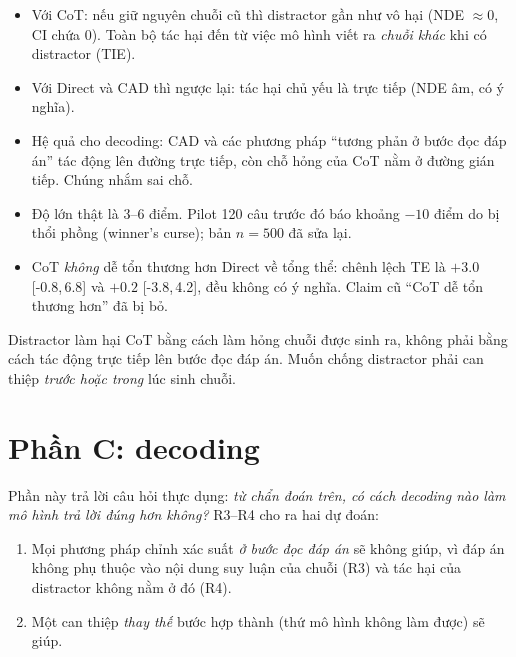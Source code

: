 \documentclass[11pt]{article}
\newcommand{\ci}[2]{{\scriptsize[#1,\,#2]}}
\begin{document}
\begin{cachdoc}
\begin{itemize}[leftmargin=*,itemsep=1pt]
\item Với CoT: nếu giữ nguyên chuỗi cũ thì distractor gần như vô hại (NDE $\approx 0$, CI chứa 0).
  Toàn bộ tác hại đến từ việc mô hình viết ra \emph{chuỗi khác} khi có distractor (TIE).
\item Với Direct và CAD thì ngược lại: tác hại chủ yếu là trực tiếp (NDE âm, có ý nghĩa).
\item Hệ quả cho decoding: CAD và các phương pháp ``tương phản ở bước đọc đáp án'' tác động lên
  đường trực tiếp, còn chỗ hỏng của CoT nằm ở đường gián tiếp. Chúng nhắm sai chỗ.
\item Độ lớn thật là 3--6 điểm. Pilot 120 câu trước đó báo khoảng $-10$ điểm do bị thổi phồng
  (winner's curse); bản $n=500$ đã sửa lại.
\item CoT \emph{không} dễ tổn thương hơn Direct về tổng thể: chênh lệch TE là $+3.0$
  \ci{-0.8}{6.8} và $+0.2$ \ci{-3.8}{4.2}, đều không có ý nghĩa. Claim cũ ``CoT dễ tổn thương
  hơn'' đã bị bỏ.
\end{itemize}
\end{cachdoc}

\begin{ketluan}
Distractor làm hại CoT bằng cách làm hỏng chuỗi được sinh ra, không phải bằng cách tác động trực
tiếp lên bước đọc đáp án. Muốn chống distractor phải can thiệp \emph{trước hoặc trong} lúc sinh
chuỗi.
\end{ketluan}

\section{Phần C: decoding}

Phần này trả lời câu hỏi thực dụng: \emph{từ chẩn đoán trên, có cách decoding nào làm mô hình trả
lời đúng hơn không?} R3--R4 cho ra hai dự đoán:
\begin{enumerate}[leftmargin=*,itemsep=1pt]
\item Mọi phương pháp chỉnh xác suất \emph{ở bước đọc đáp án} sẽ không giúp, vì đáp án không phụ
  thuộc vào nội dung suy luận của chuỗi (R3) và tác hại của distractor không nằm ở đó (R4).
\item Một can thiệp \emph{thay thế} bước hợp thành (thứ mô hình không làm được) sẽ giúp.
\end{enumerate}
\end{document}
